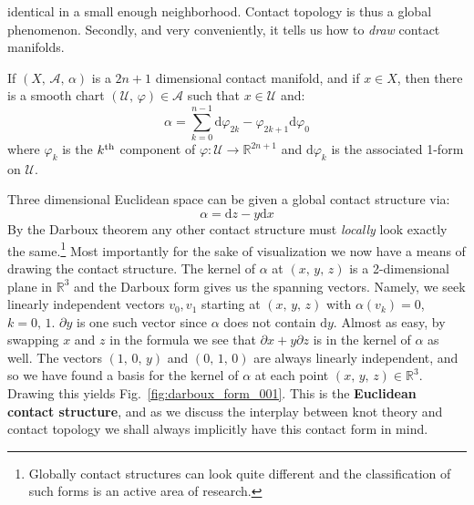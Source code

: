     identical in a small enough neighborhood. Contact topology is thus a global
    phenomenon. Secondly, and very conveniently, it tells us how to
    \textit{draw} contact manifolds.
    \begin{theorem}
        If $(X,\,\mathcal{A},\,\alpha)$ is a $2n+1$ dimensional
        contact manifold, and if $x\in{X}$, then there is a smooth chart
        $(\mathcal{U},\,\varphi)\in\mathcal{A}$ such that $x\in\mathcal{U}$
        and:
        \begin{equation}
            \alpha=
            \sum_{k=0}^{n-1}
            \textrm{d}\varphi_{2k}-\varphi_{2k+1}\textrm{d}\varphi_{0}
        \end{equation}
        where $\varphi_{k}$ is the $k^{\small\textrm{th}}$ component of
        $\varphi:\mathcal{U}\rightarrow\mathbb{R}^{2n+1}$ and
        $\textrm{d}\varphi_{k}$ is the associated 1-form on $\mathcal{U}$.
    \end{theorem}
    Three dimensional Euclidean space can be given a global contact structure
    via:
    \begin{equation}
        \label{eqn:euclidean_contact_form}
        \alpha=\textrm{d}z-y\textrm{d}x
    \end{equation}
    By the Darboux theorem any other
    contact structure must \textit{locally} look exactly the same.\footnote{%
        Globally contact structures can look quite different and the
        classification of such forms is an active area of research.
    }
    Most importantly for the sake of visualization we now have a means of
    drawing the contact structure. The kernel of $\alpha$ at $(x,\,y,\,z)$ is a
    2-dimensional plane in $\mathbb{R}^{3}$ and the Darboux form gives us the
    spanning vectors. Namely, we seek linearly independent vectors $v_{0},v_{1}$
    starting at $(x,\,y,\,z)$ with $\alpha(v_{k})=0$, $k=0,\,1$.
    $\partial{y}$ is one such vector since
    $\alpha$ does not contain $\textrm{d}y$. Almost as easy, by swapping $x$
    and $z$ in the formula we see that $\partial{x}+y\partial{z}$ is in the
    kernel of $\alpha$ as well. The vectors $(1,\,0,\,y)$ and $(0,\,1,\,0)$
    are always linearly independent, and so we have found a basis for the
    kernel of $\alpha$ at each point $(x,\,y,\,z)\in\mathbb{R}^{3}$.
    Drawing this yields Fig.~\ref{fig:darboux_form_001}. This is the
    \textbf{Euclidean contact structure}, and as we discuss the interplay
    between knot theory and contact topology we shall always implicitly have
    this contact form in mind.
